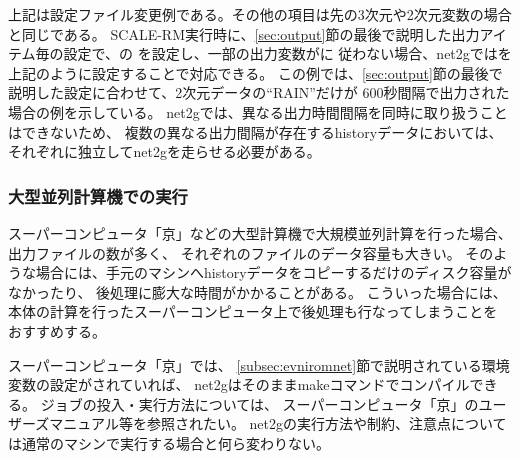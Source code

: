 上記は設定ファイル変更例である。その他の項目は先の3次元や2次元変数の場合と同じである。
SCALE-RM実行時に、\ref{sec:output}節の最後で説明した出力アイテム毎の設定で、の
を設定し、一部の出力変数がに
従わない場合、net2gではを上記のように設定することで対応できる。
この例では、\ref{sec:output}節の最後で説明した設定に合わせて、2次元データの``RAIN''だけが
600秒間隔で出力された場合の例を示している。
net2gでは、異なる出力時間間隔を同時に取り扱うことはできないため、
複数の異なる出力間隔が存在するhistoryデータにおいては、
それぞれに独立してnet2gを走らせる必要がある。

\subsubsection{大型並列計算機での実行}
スーパーコンピュータ「京」などの大型計算機で大規模並列計算を行った場合、出力ファイルの数が多く、
それぞれのファイルのデータ容量も大きい。
そのような場合には、手元のマシンへhistoryデータをコピーするだけのディスク容量がなかったり、
後処理に膨大な時間がかかることがある。
こういった場合には、
\scalerm 本体の計算を行ったスーパーコンピュータ上で後処理も行なってしまうことを
おすすめする。

スーパーコンピュータ「京」では、
\ref{subsec:evniromnet}節で説明されている環境変数の設定がされていれば、
net2gはそのままmakeコマンドでコンパイルできる。
ジョブの投入・実行方法については、
スーパーコンピュータ「京」のユーザーズマニュアル等を参照されたい。
net2gの実行方法や制約、注意点については通常のマシンで実行する場合と何ら変わりない。




